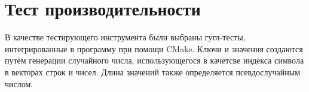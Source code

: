 \section{Тест производительности}

В качестве тестирующего инструмента были выбраны гугл-тесты, интегрированные в программу при помощи CMake. Ключи и значения создаются путём генерации случайного числа, использующегося в качетсве индекса символа в векторах строк и чисел. Длина значений также определяется псевдослучайным числом.

\pagebreak

